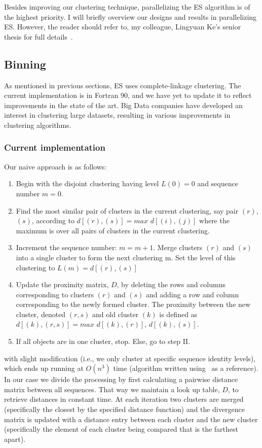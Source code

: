 Besides improving our clustering technique, parallelizing the ES algorithm is of the highest priority.
I will briefly overview our designs and results in parallelizing ES.
However, the reader should refer to, my colleague, Lingyuan Ke's senior thesis for full details~\cite{lingThesis}.
\subsection*{Binning}
As mentioned in previous sections, ES uses complete-linkage clustering.
The current implementation is in Fortran 90, and we have yet to update it to reflect improvements in the state of the art.
Big Data companies have developed an interest in clustering large datasets, resulting in various improvements in clustering algorithms.
\subsubsection*{Current implementation}
Our naive approach is as follows:
\begin{enumerate}[I]
\item Begin with the disjoint clustering having level $L(0) = 0$ and sequence number $m = 0$.
\item Find the most similar pair of clusters in the current clustering, say pair $(r)$, $(s)$, according to $d[(r),(s)] = max$ $d[(i),(j)]$ where the maximum is over all pairs of clusters in the current clustering.
\item Increment the sequence number: $m = m + 1$. Merge clusters $(r)$ and $(s)$ into a single cluster to form the next clustering m. Set the level of this clustering to $L(m) = d[(r),(s)]$
\item Update the proximity matrix, $D$, by deleting the rows and columns corresponding to clusters $(r)$ and $(s)$ and adding a row and column corresponding to the newly formed cluster. The proximity between the new cluster, denoted $(r,s)$ and old cluster $(k)$ is defined as $d[(k), (r,s)] = max$ $d[(k),(r)]$, $d[(k),(s)]$.
\item If all objects are in one cluster, stop. Else, go to step II.
\end{enumerate}
with slight modification (i.e., we only cluster at specific sequence identity levels), which ends up running at $O(n^3)$ time (algorithm written using~\cite{FastClust} as a reference).
In our case we divide the processing by first calculating a pairwise distance matrix between all sequences.
That way we maintain a look up table, $D$, to retrieve distances in constant time.
At each iteration two clusters are merged (specifically the closest by the specified distance function) and the divergence matrix is updated with a distance entry between each cluster and the new cluster (specifically the element of each cluster being compared that is the farthest apart).

